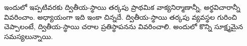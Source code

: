 \documentclass[../../../include/open-logic-chapter]{subfiles}
\begin{document}

\begin{editorial}
ఇందులో ఇప్పటివరకు ద్వితీయ-స్థాయి తర్కపు ప్రాథమిక వాక్యనిర్మాణాన్నీ,
అర్థవిచారాన్నీ వివరించాం. అధ్యాయంగా ఇది ఇంకా చిన్నదే. ద్వితీయ-స్థాయి
తర్కపు  వ్యవస్థల గురించి చెప్పాలంటే, ద్వితీయ-స్థాయి చరాల
ప్రతిస్థాపనను వివరించాలి. అందులో కొన్ని సూక్ష్మమైన సమస్యలున్నాయి.
\end{editorial}







\OLEndChapterHook
\end{document}
